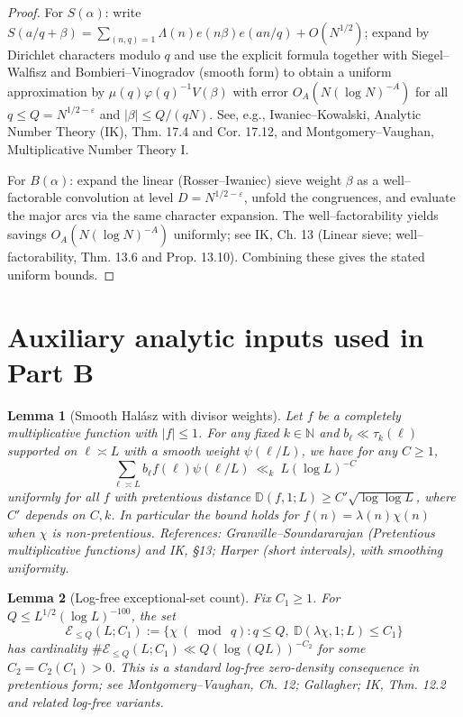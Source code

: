 \documentclass[11pt]{article}
\newtheorem{lemma}{Lemma}[part]
\theoremstyle{definition}
\theoremstyle{remark}
\numberwithin{equation}{part}
\begin{document}
\begin{proof}
	For $S(\alpha)$: write $S(a/q+\beta)=\sum_{(n,q)=1}\Lambda(n)e(n\beta)e(an/q)+O(N^{1/2})$; expand by Dirichlet characters modulo $q$ and use the explicit formula together with Siegel--Walfisz and Bombieri--Vinogradov (smooth form) to obtain a uniform approximation by $\mu(q)\varphi(q)^{-1}V(\beta)$ with error $O_A(N(\log N)^{-A})$ for all $q\le Q=N^{1/2-\varepsilon}$ and $|\beta|\le Q/(qN)$. See, e.g., Iwaniec--Kowalski, Analytic Number Theory (IK), Thm. 17.4 and Cor. 17.12, and Montgomery--Vaughan, Multiplicative Number Theory I.

	For $B(\alpha)$: expand the linear (Rosser--Iwaniec) sieve weight $\beta$ as a well--factorable convolution at level $D=N^{1/2-\varepsilon}$, unfold the congruences, and evaluate the major arcs via the same character expansion. The well--factorability yields savings $O_A(N(\log N)^{-A})$ uniformly; see IK, Ch. 13 (Linear sieve; well--factorability, Thm. 13.6 and Prop. 13.10). Combining these gives the stated uniform bounds.
\end{proof}

\section{Auxiliary analytic inputs used in Part B}

\begin{lemma}[Smooth Hal\'asz with divisor weights]\label{lem:halasz-smooth}
	Let $f$ be a completely multiplicative function with $|f|\le 1$. For any fixed $k\in\mathbb N$ and $b_\ell\ll \tau_k(\ell)$ supported on $\ell\asymp L$ with a smooth weight $\psi(\ell/L)$, we have for any $C\ge 1$,
	\[
		\sum_{\ell\asymp L} b_\ell f(\ell)\psi(\ell/L)\ \ll_{k}\ L(\log L)^{-C}
	\]
	uniformly for all $f$ with pretentious distance $\mathbb D(f,1;L)\ge C'\sqrt{\log\log L}$, where $C'$ depends on $C,k$. In particular the bound holds for $f(n)=\lambda(n)\chi(n)$ when $\chi$ is non-pretentious. References: Granville--Soundararajan (Pretentious multiplicative functions) and IK, §13; Harper (short intervals), with smoothing uniformity.
\end{lemma}

\begin{lemma}[Log-free exceptional-set count]\label{lem:logfree-density}
	Fix $C_1\ge 1$. For $Q\le L^{1/2}(\log L)^{-100}$, the set
	\[
		\mathcal E_{\le Q}(L;C_1):=\{\chi\ (\bmod\ q): q\le Q,\ \mathbb D(\lambda\chi,1;L)\le C_1\}
	\]
	has cardinality $\#\mathcal E_{\le Q}(L;C_1)\ll Q(\log (QL))^{-C_2}$ for some $C_2=C_2(C_1)>0$. This is a standard log-free zero-density consequence in pretentious form; see Montgomery--Vaughan, Ch. 12; Gallagher; IK, Thm. 12.2 and related log-free variants.
\end{lemma}
\end{document}
